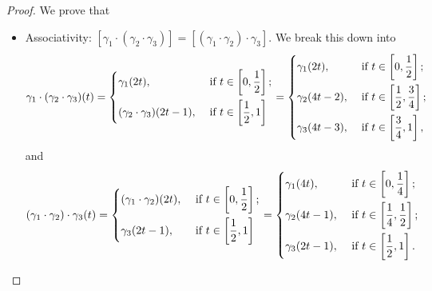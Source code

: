 \begin{proof}
	\par We prove that
	\begin{itemize}
		\item Associativity: \([\gamma_{1}\cdot (\gamma_2\cdot \gamma_3)] = [(\gamma_1\cdot \gamma_2)\cdot \gamma_3]\). We break this down into
		      \[
			      \gamma_1\cdot(\gamma_2\cdot \gamma_3)(t) = \begin{dcases}
				      \gamma_{1}(2t ),                 & \text{ if }  t\in\left[0, \frac{1}{2}\right]; \\
				      (\gamma_2\cdot \gamma_3)(2t-1) , & \text{ if }  t\in\left[\frac{1}{2}, 1\right]
			      \end{dcases} = \begin{dcases}
				      \gamma_{1}(2t ), & \text{ if }  t\in\left[0, \frac{1}{2}\right];           \\
				      \gamma_2(4t-2) , & \text{ if }  t\in\left[\frac{1}{2}, \frac{3}{4}\right]; \\
				      \gamma_3(4t-3) , & \text{ if }  t\in\left[\frac{3}{4}, 1\right],
			      \end{dcases}
		      \]
		      and
		      \[
			      (\gamma_1\cdot\gamma_2)\cdot \gamma_3(t) = \begin{dcases}
				      (\gamma_{1}\cdot \gamma_2) (2t ), & \text{ if }  t\in\left[0, \frac{1}{2}\right]; \\
				      \gamma_3(2t-1) ,                  & \text{ if }  t\in\left[\frac{1}{2}, 1\right]
			      \end{dcases} = \begin{dcases}
				      \gamma_{1}(4t),  & \text{ if }  t\in\left[0, \frac{1}{4}\right];           \\
				      \gamma_2(4t-1) , & \text{ if }  t\in\left[\frac{1}{4}, \frac{1}{2}\right]; \\
				      \gamma_3(2t-1) , & \text{ if }  t\in\left[\frac{1}{2}, 1\right].
			      \end{dcases}
		      \]


\end{itemize}
\end{proof}
